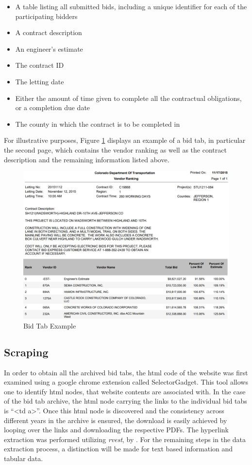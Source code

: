 \documentclass[a4paper,12pt, headsepline]{scrartcl}
\numberwithin{equation}{section}
\begin{document}
\begin{itemize}
	\item A table listing all submitted bids, including a unique identifier for each of the participating bidders
	\item A contract description
	\item An engineer's estimate
	\item The contract ID
	\item The letting date
	\item Either the amount of time given to complete all the contractual obligations, or a completion due date
	\item The county in which the contract is to be completed in 
\end{itemize}

For illustrative purposes, Figure \ref{fig:bidtab} displays an example of a bid tab, in particular the second page, which contains the vendor ranking as well as the contract description and the remaining information listed above.

\begin{figure}[H]
	\includegraphics[width = 14	cm]{figures/Bid_Tab_exmpl.PNG}
	\caption{Bid Tab Example}\label{fig:bidtab}
\end{figure}

\subsection{Scraping}\label{subsec:scrap}
In order to obtain all the archived bid tabs, the html code of the website was first examined using a google chrome extension called SelectorGadget. This tool allows one to identify html nodes, that website contents are associated with. In the case of the bid tab archive, the html node carrying the links to the individual bid tabs is \enquote{<td a>}. Once this html node is discovered and the consistency across different years in the archive is ensured, the download is easily achieved by looping over the links and downloading the  respective PDFs. The hyperlink extraction was performed utilizing \textit{rvest}, by \citet{rvest}. For the remaining steps in the data extraction process, a distinction will be made for text based information and tabular data.
\end{document}
